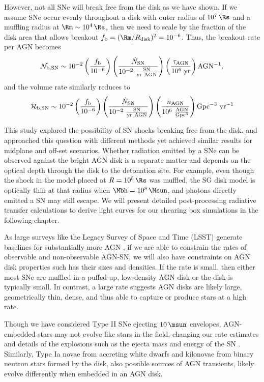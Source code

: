 However, not all SNe will break free from the disk as we have shown.
If we assume SNe occur evenly throughout a disk with outer radius of $10^7\,\Rs$ and a muffling radius at $\Rm\sim10^4\,\Rs$, then we need to scale by the fraction of the disk area that allows breakout $f_{\rm b} = (\Rm / R_{\rm disk})^{2} = 10^{-6}$.
Thus, the breakout rate per AGN becomes
\begin{equation}
    \mathcal{N_{\rm b,SN}} \sim 10^{-2} \left( \frac{f_{\rm b}}{10^{-6}} \right) \left( \frac{\dot{N}_{\rm SN}}{\rm 10^{-2}\ \frac{SN}{yr\ AGN}} \right) \left( \frac{\tau_{\rm AGN}}{\rm 10^6\ yr} \right) \mathrm{AGN^{-1}},
\end{equation}
and the volume rate similarly reduces to
\begin{equation}
    \mathcal{R_{\rm b,SN}} \sim 10^{-2} \left( \frac{f_{\rm b}}{10^{-6}} \right) \left( \frac{\dot{N}_{\rm SN}}{\rm 10^{-2}\ \frac{SN}{yr\ AGN}} \right) \left( \frac{n_{\rm AGN}}{\rm 10^6\ \frac{AGN}{Gpc^3}} \right) \mathrm{Gpc^{-3}\ yr^{-1}}
\end{equation}

This study explored the possibility of SN shocks breaking free from the disk.
\citet{Moranchel+21} and \citet{Grishin+21} approached this question with different methods yet achieved similar results for midplane and off-set scenarios.
Whether radiation emitted by a SNe can be observed against the bright AGN disk is a separate matter and depends on the optical depth through the disk to the detonation site.
For example, even though the shock in the model placed at $R=10^5\,\Rs$ was muffled, the SG disk model is optically thin at that radius when $\Mbh=10^8\,\Msun$, and photons directly emitted a SN may still escape.
We will present detailed post-processing radiative transfer calculations to derive light curves for our shearing box simulations in the following chapter.

As large surveys like the Legacy Survey of Space and Time (LSST) generate baselines for substantially more AGN \citep{Kovacevic+22}, if we are able to constrain the rates of observable and non-observable AGN-SN, we will also have constraints on AGN disk properties such has their sizes and densities.
If the rate is small, then either most SNe are muffled in a puffed-up, low-density AGN disk or the disk is typically small.
In contrast, a large rate suggests AGN disks are likely large, geometrically thin, dense, and thus able to capture or produce stars at a high rate.

Though we have considered Type II SNe ejecting $10\,\msun$ envelopes, AGN-embedded stars may not evolve like stars in the field, changing our rate estimates and details of the explosions such as the ejecta mass and energy of the SN \citep{CantielloJermynLin21, DittmannJermynCantiello23}.
Similarly, Type Ia novae from accreting white dwarfs and kilonovae from binary neutron stars formed by the disk, also possible sources of AGN transients, likely evolve differently when embedded in an AGN disk.

